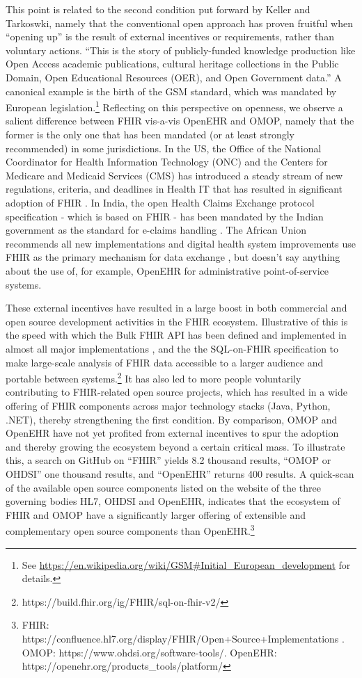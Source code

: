 \documentclass[
  authoryear]{elsarticle}
\begin{document}
This point is related to the second condition put forward by Keller and
Tarkoswki, namely that the conventional open approach has proven
fruitful when ``opening up'' is the result of external incentives or
requirements, rather than voluntary actions. ``This is the story of
publicly-funded knowledge production like Open Access academic
publications, cultural heritage collections in the Public Domain, Open
Educational Resources (OER), and Open Government data.''
\citep{keller2021paradox} A canonical example is the birth of the GSM
standard, which was mandated by European legislation.\footnote{See
  \url{https://en.wikipedia.org/wiki/GSM\#Initial_European_development}
  for details.} Reflecting on this perspective on openness, we observe a
salient difference between FHIR vis-a-vis OpenEHR and OMOP, namely that
the former is the only one that has been mandated (or at least strongly
recommended) in some jurisdictions. In the US, the Office of the
National Coordinator for Health Information Technology (ONC) and the
Centers for Medicare and Medicaid Services (CMS) has introduced a steady
stream of new regulations, criteria, and deadlines in Health IT that has
resulted in significant adoption of FHIR \citep{firely2023fhir}. In
India, the open Health Claims Exchange protocol specification - which is
based on FHIR - has been mandated by the Indian government as the
standard for e-claims handling \citep{india2020national, hcx}. The
African Union recommends all new implementations and digital health
system improvements use FHIR as the primary mechanism for data exchange
\citep{tilahun2023african}, but doesn't say anything about the use of,
for example, OpenEHR for administrative point-of-service systems.

These external incentives have resulted in a large boost in both
commercial and open source development activities in the FHIR ecosystem.
Illustrative of this is the speed with which the Bulk FHIR API has been
defined and implemented in almost all major implementations
\citep{mandl2020push, jones2021landscape}, and the the SQL-on-FHIR
specification to make large-scale analysis of FHIR data accessible to a
larger audience and portable between systems.\footnote{https://build.fhir.org/ig/FHIR/sql-on-fhir-v2/}
It has also led to more people voluntarily contributing to FHIR-related
open source projects, which has resulted in a wide offering of FHIR
components across major technology stacks (Java, Python, .NET), thereby
strengthening the first condition. By comparison, OMOP and OpenEHR have
not yet profited from external incentives to spur the adoption and
thereby growing the ecosystem beyond a certain critical mass. To
illustrate this, a search on GitHub on ``FHIR'' yields 8.2 thousand
results, ``OMOP or OHDSI'' one thousand results, and ``OpenEHR'' returns
400 results. A quick-scan of the available open source components listed
on the website of the three governing bodies HL7, OHDSI and OpenEHR,
indicates that the ecosystem of FHIR and OMOP have a significantly
larger offering of extensible and complementary open source components
than OpenEHR.\footnote{FHIR:
  https://confluence.hl7.org/display/FHIR/Open+Source+Implementations .
  OMOP: https://www.ohdsi.org/software-tools/. OpenEHR:
  https://openehr.org/products\_tools/platform/}
\end{document}
